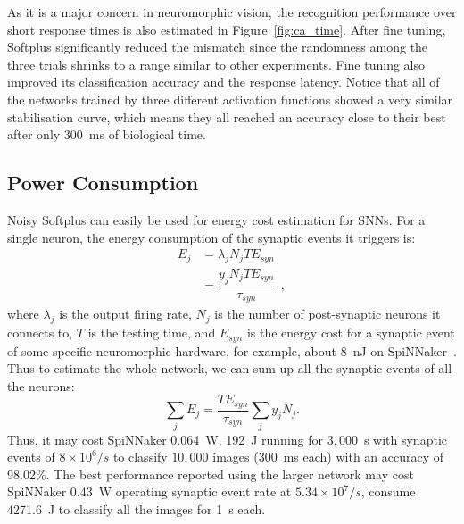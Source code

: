 	As it is a major concern in neuromorphic vision, the recognition performance over short response times is also estimated in Figure~\ref{fig:ca_time}.
	After fine tuning, Softplus significantly reduced the mismatch since the randomness among the three trials shrinks to a range similar to other experiments.
	Fine tuning also improved its classification accuracy and the response latency.
	Notice that all of the networks trained by three different activation functions showed a very similar stabilisation curve, which means they all reached an accuracy close to their best after only 300~ms of biological time. 
	
	
	\subsection{Power Consumption}
	Noisy Softplus can easily be used for energy cost estimation for SNNs.
	For a single neuron, the energy consumption of the synaptic events it triggers is:
	\begin{equation}
	\begin{aligned}
	E_{j} &= \lambda_j N_j T E_{syn}\\
	&= \dfrac{y_j N_j T E_{syn}}{\tau_{syn}}~~,
	\end{aligned}
	\label{equ:energy}
	\end{equation}
	where $\lambda_j$ is the output firing rate, $N_j$ is the number of post-synaptic neurons it connects to, $T$ is the testing time, and $E_{syn}$ is the energy cost for a synaptic event of some specific neuromorphic hardware, for example, about 8~nJ on SpiNNaker~\citep{stromatias2013power}.
	Thus to estimate the whole network, we can sum up all the synaptic events of all the neurons:
	\begin{equation}
	\sum_j E_{j} =  \dfrac{T E_{syn}}{\tau_{syn}} \sum_{j}y_j N_j.
	\end{equation}
	Thus, it may cost SpiNNaker 0.064~W, 192~J running for $3,000$~s with synaptic events of $8\times10^6/s$ to classify $10,000$ images (300~ms each) with an accuracy of 98.02\%.
	The best performance reported using the larger network may cost SpiNNaker 0.43~W operating synaptic event rate at $5.34\times10^7/s$, consume 4271.6~J to classify all the images for 1~s each.

